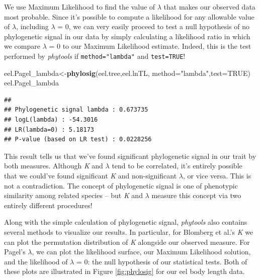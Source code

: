 \documentclass[fleqn,10pt,lineno]{wlpeerj} %
\newenvironment{Shaded}{\begin{snugshade}}{\end{snugshade}}
\newcommand{\AttributeTok}[1]{\textcolor[rgb]{0.13,0.29,0.53}{#1}}
\newcommand{\ConstantTok}[1]{\textcolor[rgb]{0.56,0.35,0.01}{#1}}
\newcommand{\FunctionTok}[1]{\textcolor[rgb]{0.13,0.29,0.53}{\textbf{#1}}}
\newcommand{\NormalTok}[1]{#1}
\newcommand{\OtherTok}[1]{\textcolor[rgb]{0.56,0.35,0.01}{#1}}
\newcommand{\StringTok}[1]{\textcolor[rgb]{0.31,0.60,0.02}{#1}}
\begin{document}
We use Maximum Likelihood to find the value of \(\lambda\) that makes our observed data most probable. Since it's possible to compute a likelihood for any allowable value of \(\lambda\), including \(\lambda\) = 0, we can very easily proceed to test a null hypothesis of no phylogenetic signal in our data by simply calculating a likelihood ratio in which we compare \(\lambda\) = 0 to our Maximum Likelihood estimate. Indeed, this is the test performed by \emph{phytools} if \texttt{method="lambda"} and \texttt{test=TRUE}!

\begin{Shaded}
\begin{Highlighting}[]
\NormalTok{eel.Pagel\_lambda}\OtherTok{\textless{}{-}}\FunctionTok{phylosig}\NormalTok{(eel.tree,eel.lnTL,}
  \AttributeTok{method=}\StringTok{"lambda"}\NormalTok{,}\AttributeTok{test=}\ConstantTok{TRUE}\NormalTok{)}
\NormalTok{eel.Pagel\_lambda}
\end{Highlighting}
\end{Shaded}

\begin{verbatim}
## 
## Phylogenetic signal lambda : 0.673735 
## logL(lambda) : -54.3016 
## LR(lambda=0) : 5.18173 
## P-value (based on LR test) : 0.0228256
\end{verbatim}

This result tells us that we've found significant phylogenetic signal in our trait by both measures. Although \emph{K} and \(\lambda\) tend to be correlated, it's entirely possible that we could've found significant \emph{K} and non-significant \(\lambda\), or vice versa. This is not a contradiction. The concept of phylogenetic signal is one of phenotypic similarity among related species -- but \emph{K} and \(\lambda\) measure this concept via two entirely different procedures!

Along with the simple calculation of phylogenetic signal, \emph{phytools} also contains several methods to visualize our results. In particular, for Blomberg et al.'s \emph{K} we can plot the permutation distribution of \emph{K} alongside our observed measure. For Pagel's \(\lambda\), we can plot the likelihood surface, our Maximum Likelihood solution, and the likelihood of \(\lambda\) = 0: the null hypothesis of our statistical tests. Both of these plots are illustrated in Figure \ref{fig:phylosig} for our eel body length data.
\end{document}

